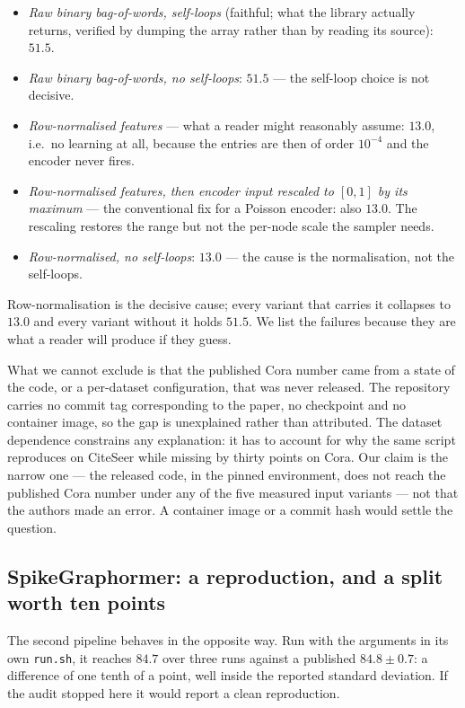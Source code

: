 \begin{itemize}\itemsep2pt
\item \emph{Raw binary bag-of-words, self-loops} (faithful; what the library actually returns,
verified by dumping the array rather than by reading its source): $51.5$.
\item \emph{Raw binary bag-of-words, no self-loops}: $51.5$ --- the self-loop choice is not
decisive.
\item \emph{Row-normalised features} --- what a reader might reasonably assume: $13.0$, i.e.\ no
learning at all, because the entries are then of order $10^{-4}$ and the encoder never fires.
\item \emph{Row-normalised features, then encoder input rescaled to $[0,1]$ by its maximum} --- the
conventional fix for a Poisson encoder: also $13.0$. The rescaling restores the range but not the
per-node scale the sampler needs.
\item \emph{Row-normalised, no self-loops}: $13.0$ --- the cause is the normalisation, not the
self-loops.
\end{itemize}

Row-normalisation is the decisive cause; every variant that carries it collapses to $13.0$ and
every variant without it holds $51.5$. We list the failures because they are what a reader will
produce if they guess.

What we cannot exclude is that the published Cora number came from a state of the code, or a
per-dataset configuration, that was never released. The repository carries no commit tag
corresponding to the paper, no checkpoint and no container image, so the gap is unexplained rather
than attributed. The dataset dependence constrains any explanation: it has to account for why the
same script reproduces on CiteSeer while missing by thirty points on Cora. Our claim is the narrow
one --- the released code, in the pinned environment, does not reach the published Cora number under
any of the five measured input variants --- not that the authors made an error. A container image or
a commit hash would settle the question.

\subsection{SpikeGraphormer: a reproduction, and a split worth ten points}
\label{sec:split}



The second pipeline behaves in the opposite way. Run with the arguments in its own \texttt{run.sh}, it
reaches $84.7$ over three runs against a published $84.8\pm0.7$: a difference of one tenth of a
point, well inside the reported standard deviation. If the audit stopped here it would report a
clean reproduction.

